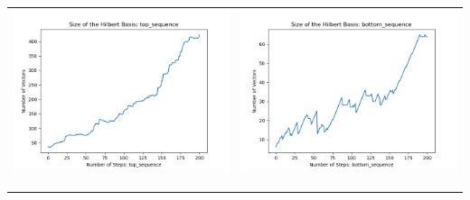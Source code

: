 \documentclass[10pt]{article}
\begin{document}
\begin{tabular}{c|c}
\begin{minipage}{.45\textwidth}
\includegraphics[width=\textwidth]{"DATA/5d/6 generators 2 bound B/top_sequence SIZE"}
\end{minipage} &
\begin{minipage}{.45\textwidth}
\includegraphics[width=\textwidth]{"DATA/5d/6 generators 2 bound B bottomup/bottom_sequence SIZE"}
\end{minipage} \\ \\
\hline \\\begin{minipage}{.45\textwidth}

\end{minipage}
\end{tabular}
\end{document}
